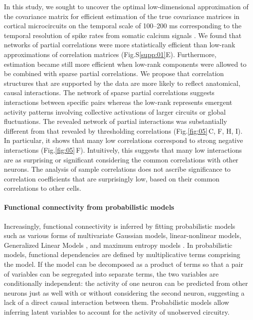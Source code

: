 \documentclass[10pt]{article}
\newcommand{\figref}[2]{Fig.\;\ref{fig:#1}\,#2}
\begin{document}
In this study, we sought to uncover the optimal low-dimensional approximation of the covariance matrix for efficient estimation of the true covariance matrices in cortical microcircuits on the temporal scale of 100--200 ms corresponding to the temporal resolution of spike rates from somatic calcium signals \cite{Cotton:2013}.  We found that networks of partial correlations were more statistically efficient than low-rank approximations of correlation matrices (Fig.\;S\ref{supp:01}\;E). Furthermore, estimation became still more efficient when low-rank components were allowed to be combined with sparse partial correlations. We propose that correlation structures that are supported by the data  are more likely to reflect anatomical, causal interactions. The network of sparse partial correlations suggests interactions between specific pairs whereas the low-rank represents emergent activity patterns involving collective activations of larger circuits or global fluctuations. The revealed network of partial interactions was substantially different from that revealed by thresholding correlations (\figref{05}{C, F, H, I}). In particular, it shows that many low correlations correspond to strong negative interactions (\figref{05}{F}). Intuitively, this suggests that many low interactions are as surprising or significant considering the common correlations with other neurons. The analysis of sample correlations does not ascribe significance to correlation coefficients that are surprisingly low, based on their common correlations to other cells.


\paragraph{Functional connectivity from probabilistic models}
Increasingly, functional connectivity is inferred by fitting probabilistic models such as various forms of multivariate Gaussian models, linear-nonlinear models, Generalized Linear Models \cite{Pillow:2008}, and maximum entropy models \cite{Schneidman:2006, Tkacik:2006, Tang:2008, Shlens:2009}. In probabilistic models, functional dependencies are defined by multiplicative terms comprising the model. If the model can be decomposed as a product of terms so that a pair of variables can be segregated into separate terms, the two variables are conditionally independent: the activity of one neuron can be predicted from other neurons just as well with or without considering the second neuron, suggesting a lack of a direct causal interaction between them. Probabilistic models allow inferring latent variables to account for the activity of unobserved circuitry.
\end{document}
